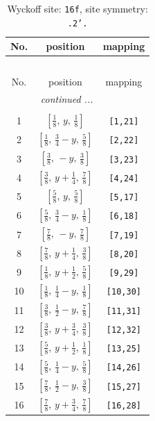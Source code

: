 \documentclass[fleqn,8pt]{jsarticle}
\begin{document}
\renewcommand{\arraystretch}{1.2}
\begin{longtable}{ccc}
\caption{Wyckoff site: {\tt 16f}, site symmetry: {\tt .2'.}}
 \\
 \hline \hline
No. & position & mapping \\ \hline \endfirsthead

\multicolumn{2}{l}{\tablename\ \thetable{}} \\
 \hline \hline
No. & position & mapping \\ \hline \endhead

 \hline \hline
\multicolumn{2}{r}{\footnotesize\it continued ...} \\ \endfoot

 \hline \hline
\multicolumn{2}{r}{} \\ \endlastfoot

1 & $\left[ \frac{1}{8},\, y,\, \frac{1}{8} \right]$ & {\tt [1,21]} \\ \hline
2 & $\left[ \frac{1}{8},\, \frac{3}{4} - y,\, \frac{5}{8} \right]$ & {\tt [2,22]} \\ \hline
3 & $\left[ \frac{3}{8},\, - y,\, \frac{3}{8} \right]$ & {\tt [3,23]} \\ \hline
4 & $\left[ \frac{3}{8},\, y + \frac{1}{4},\, \frac{7}{8} \right]$ & {\tt [4,24]} \\ \hline
5 & $\left[ \frac{5}{8},\, y,\, \frac{5}{8} \right]$ & {\tt [5,17]} \\ \hline
6 & $\left[ \frac{5}{8},\, \frac{3}{4} - y,\, \frac{1}{8} \right]$ & {\tt [6,18]} \\ \hline
7 & $\left[ \frac{7}{8},\, - y,\, \frac{7}{8} \right]$ & {\tt [7,19]} \\ \hline
8 & $\left[ \frac{7}{8},\, y + \frac{1}{4},\, \frac{3}{8} \right]$ & {\tt [8,20]} \\ \hline
9 & $\left[ \frac{1}{8},\, y + \frac{1}{2},\, \frac{5}{8} \right]$ & {\tt [9,29]} \\ \hline
10 & $\left[ \frac{1}{8},\, \frac{1}{4} - y,\, \frac{1}{8} \right]$ & {\tt [10,30]} \\ \hline
11 & $\left[ \frac{3}{8},\, \frac{1}{2} - y,\, \frac{7}{8} \right]$ & {\tt [11,31]} \\ \hline
12 & $\left[ \frac{3}{8},\, y + \frac{3}{4},\, \frac{3}{8} \right]$ & {\tt [12,32]} \\ \hline
13 & $\left[ \frac{5}{8},\, y + \frac{1}{2},\, \frac{1}{8} \right]$ & {\tt [13,25]} \\ \hline
14 & $\left[ \frac{5}{8},\, \frac{1}{4} - y,\, \frac{5}{8} \right]$ & {\tt [14,26]} \\ \hline
15 & $\left[ \frac{7}{8},\, \frac{1}{2} - y,\, \frac{3}{8} \right]$ & {\tt [15,27]} \\ \hline
16 & $\left[ \frac{7}{8},\, y + \frac{3}{4},\, \frac{7}{8} \right]$ & {\tt [16,28]} \\
\end{longtable}
\end{document}
